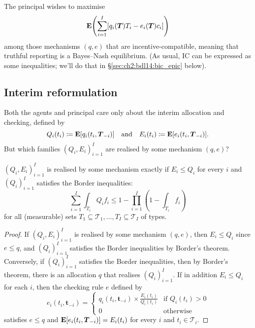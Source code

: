 The principal wishes to maximise
%
\begin{equation*}
	\E\left(
	\sum_{i=1}^I 
	\left[
	q_i(\boldsymbol{T}) T_i - e_i(\boldsymbol{T}) c_i
	\right]
	\right)
\end{equation*}
%
among those mechanisms $(q,e)$ that are incentive-compatible,
meaning that truthful reporting is a Bayes--Nash equilibrium.
(As usual, IC can be expressed as some inequalities;
we'll do that in §\ref{sec:ch2:bdl14:bic_epic} below).



\subsection{Interim reformulation}
\label{sec:ch2:bdl14:interim}

Both the agents and principal care only about the interim allocation and checking, defined by
%
\begin{equation*}
	Q_i(t_i)
	\coloneqq \E \left[ q_i(t_i,\boldsymbol{T}_{-i}) \right] 
	\quad \text{and} \quad
	E_i(t_i)
	\coloneqq \E \left[ e_i(t_i,\boldsymbol{T}_{-i}) \right] .
\end{equation*}
%
But which families $(Q_i,E_i)_{i=1}^I$ are realised by some mechanism $(q,e)$?

\begin{lemma}
	\label{lemma:bdl14_border}
	$(Q_i,E_i)_{i=1}^I$ is realised by some mechanism
	exactly if $E_i \leq Q_i$ for every $i$ and $(Q_i)_{i=1}^I$ satisfies the Border inequalities:
	\begin{equation*}
		\sum_{i=1}^I \int_{T_i} Q_i f_i
		\leq 1 - \prod_{i=1}^I \left( 1 - \int_{T_i} f_i \right)
	\end{equation*}
	for all (measurable) sets $T_1 \subseteq \mathcal{T}_1, \dots, T_I \subseteq \mathcal{T}_I$ of types.
\end{lemma}

\begin{proof}
	If $(Q_i,E_i)_{i=1}^I$ is realised by some mechanism $(q,e)$,
	then $E_i \leq Q_i$ since $e \leq q$,
	and $(Q_i)_{i=1}^I$ satisfies the Border inequalities
	by Border's theorem.
	Conversely, if $(Q_i)_{i=1}^I$ satisfies the Border inequalities,
	then by Border's theorem,
	there is an allocation $q$ that realises $(Q_i)_{i=1}^I$.
	If in addition $E_i \leq Q_i$ for each $i$,
	then the checking rule $e$ defined by
	\begin{equation*}
		e_i(t_i,\boldsymbol{t}_{-i})
		=
		\begin{cases}
			q_i(t_i,\boldsymbol{t}_{-i}) \times \frac{E_i(t_i)}{Q_i(t_i)}
			& \text{if $Q_i(t_i)>0$} \\
			0
			& \text{otherwise}
		\end{cases}
	\end{equation*}
	satisfies $e \leq q$
	and $\E\left[ e_i(t_i,\boldsymbol{T}_{-i}) \right] = E_i(t_i)$ for every $i$ and $t_i \in \mathcal{T}_i$.
\end{proof}


